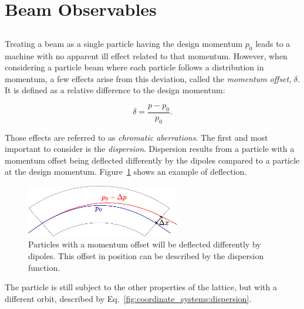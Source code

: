 \section{Beam Observables}


\subsection{}

Treating a beam as a single particle having the design momentum $p_0$ leads to a machine with no
apparent ill effect related to that momentum.
However, when considering a particle beam where each particle follows a distribution in
momentum, a few effects arise from this deviation, called the \textit{momentum offset},
$\delta$. It is defined as a relative difference to the design momentum:

\begin{equation}
    \delta = \frac{p - p_0}{p_0}.
    \label{eq:coordinate_systems:momentum_offset}
\end{equation}

Those effects are referred to as \textit{chromatic aberrations}. The first and most important to
consider is the \textit{dispersion}. Dispersion results from a particle with a momentum offset
being deflected differently by the dipoles compared to a particle at the design momentum.
Figure~\ref{fig:coordinate_systems:dispersion} shows an example of deflection. 

\begin{figure}[H]
    \centering
    \includegraphics[width=0.6\textwidth]{images/dipole.pdf}
    \caption{Particles with a momentum offset will be deflected differently by dipoles. This offset
            in position can be described by the dispersion function.}
    \label{fig:coordinate_systems:dispersion}
\end{figure}

The particle is still subject to the other properties of the lattice, but with a different orbit,
described by Eq.~\eqref{fig:coordinate_systems:dispersion}.


